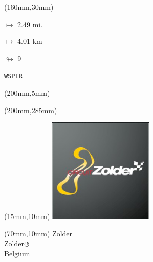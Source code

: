 \begin{textblock*}{40mm}(160mm,30mm)%
\Large
\par$\mapsto$ 2.49 mi.
\par$\mapsto$ 4.01 km
\par$\looparrowright$ 9
\par\hfill\tiny\tt WSPIR\\
\end{textblock*}
\begin{textblock*}{20mm}(200mm,5mm)%
\fbox{\thepage}
\label{WSPIR}
\end{textblock*}
\begin{textblock*}{20mm}(200mm,285mm)%
\fbox{\thepage}
\end{textblock*}

\null\newpage
\begin{textblock*}{50mm}(15mm,10mm)%
\includegraphics[width=50mm]{LG/2015-05-20_00100.png}
\end{textblock*}
\begin{textblock*}{130mm}(70mm,10mm)%
{\fontsize{20}{20}\selectfont Zolder\\}
{\fontsize{16}{16}\selectfont Zolder\hfill \huge$\circlearrowleft$\\}
{\fontsize{12}{12}\selectfont Belgium\\}
\end{textblock*}
